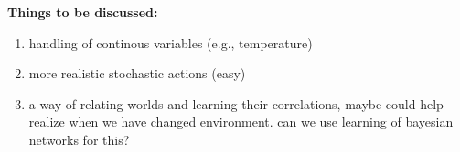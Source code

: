 \bigskip
\textbf{Things to be discussed:}
\begin{enumerate}
  \item handling of continous variables (e.g., temperature)
  \item more realistic stochastic actions (easy)
  \item a way of relating worlds and learning their correlations, maybe
  could help realize when we have changed environment. can we use learning of
  bayesian networks for this? 
\end{enumerate}


